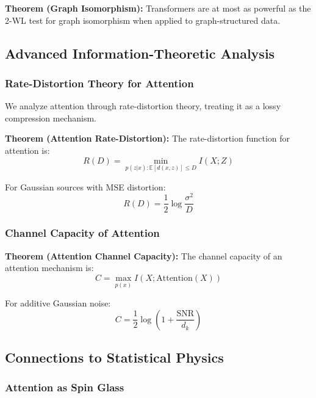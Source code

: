 \documentclass[11pt]{article}
\begin{document}
\textbf{Theorem (Graph Isomorphism):} Transformers are at most as powerful as the 2-WL test for graph isomorphism when applied to graph-structured data.

\subsection{Advanced Information-Theoretic Analysis}

\subsubsection{Rate-Distortion Theory for Attention}

We analyze attention through rate-distortion theory, treating it as a lossy compression mechanism.

\textbf{Theorem (Attention Rate-Distortion):} The rate-distortion function for attention is:
\begin{equation}
R(D) = \min_{p(z|x): \mathbb{E}[d(x,z)] \leq D} I(X;Z)
\end{equation}

For Gaussian sources with MSE distortion:
\begin{equation}
R(D) = \frac{1}{2} \log \frac{\sigma^2}{D}
\end{equation}

\subsubsection{Channel Capacity of Attention}

\textbf{Theorem (Attention Channel Capacity):} The channel capacity of an attention mechanism is:
\begin{equation}
C = \max_{p(x)} I(X; \text{Attention}(X))
\end{equation}

For additive Gaussian noise:
\begin{equation}
C = \frac{1}{2} \log\left(1 + \frac{\text{SNR}}{d_k}\right)
\end{equation}

\subsection{Connections to Statistical Physics}

\subsubsection{Attention as Spin Glass}
\end{document}
